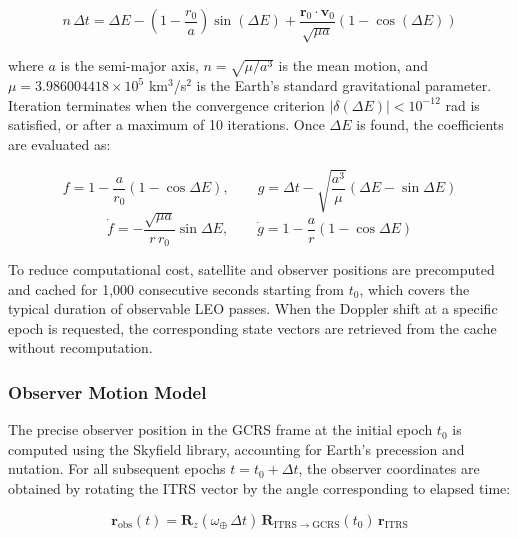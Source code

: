\documentclass[lineno,pdflatex,sn-basic,referee,]{sn-jnl}
\begin{document}
\begin{equation}
    n\,\Delta t = \Delta E
        - \left(1 - \frac{r_0}{a}\right)\sin(\Delta E)
        + \frac{\mathbf{r}_0 \cdot \mathbf{v}_0}{\sqrt{\mu a}}
          \left(1 - \cos(\Delta E)\right)
    \label{eq:kepler}
\end{equation}

\noindent
where $a$ is the semi-major axis, $n = \sqrt{\mu/a^3}$ is the mean motion, and $\mu = 3.986004418 \times 10^{5}$ km$^3$/s$^2$ is the Earth's standard gravitational parameter. Iteration terminates when the convergence criterion $|\delta(\Delta E)| < 10^{-12}$ rad is satisfied, or after a maximum of 10 iterations. Once $\Delta E$ is found, the coefficients are evaluated as:

\begin{equation}
    f = 1 - \frac{a}{r_0}(1 - \cos\Delta E),
    \qquad
    g = \Delta t - \sqrt{\frac{a^3}{\mu}}(\Delta E - \sin\Delta E)
    \label{eq:fg-coeff-fg}
\end{equation}
\begin{equation}
    \dot{f} = -\frac{\sqrt{\mu a}}{r\,r_0}\sin\Delta E,
    \qquad
    \dot{g} = 1 - \frac{a}{r}(1 - \cos\Delta E)
    \label{eq:fg-coeff-dotfg}
\end{equation}

To reduce computational cost, satellite and observer positions are precomputed and cached for 1,000 consecutive seconds starting from $t_0$, which covers the typical duration of observable LEO passes. When the Doppler shift at a specific epoch is requested, the corresponding state vectors are retrieved from the cache without recomputation.


\subsubsection{Observer Motion Model}
\label{subsubsec:observer-model}

The precise observer position in the GCRS frame at the initial epoch $t_0$ is computed using the Skyfield library, accounting for Earth's precession and nutation. For all subsequent epochs $t = t_0 + \Delta t$, the observer coordinates are obtained by rotating the ITRS vector by the angle corresponding to elapsed time:

\begin{equation}
    \mathbf{r}_{\mathrm{obs}}(t)
    = \mathbf{R}_z(\omega_\oplus\,\Delta t)\,
      \mathbf{R}_{\mathrm{ITRS}\to\mathrm{GCRS}}(t_0)\,
      \mathbf{r}_{\mathrm{ITRS}}
    \label{eq:observer-pos}
\end{equation}
\end{document}
